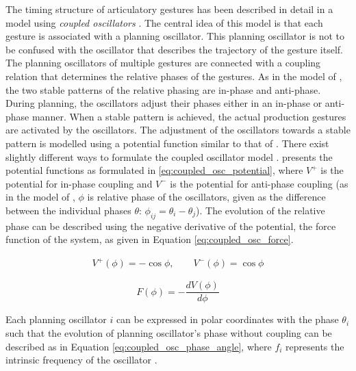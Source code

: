 The timing structure of articulatory gestures has been described in detail in a model using \emph{coupled oscillators} \citep{SaltzmanByrd2000, NamSaltzman2003, Goldsteinetal2009, Tilsen2017}. The central idea of this model is that each gesture is associated with a planning oscillator. This planning oscillator is not to be confused with the oscillator that describes the trajectory of the gesture itself. The planning oscillators of multiple gestures are connected with a coupling relation that determines the relative phases of the gestures. As in the model of \citet{HakenKelsoBunz1985}, the two stable patterns of the relative phasing are in-phase and anti-phase. During planning, the oscillators adjust their phases either in an in-phase or anti-phase manner. When a stable pattern is achieved, the actual production gestures are activated by the oscillators. The adjustment of the oscillators towards a stable pattern is modelled using a potential function similar to that of \citet{HakenKelsoBunz1985}. There exist slightly different ways to formulate the coupled oscillator model \citep{SaltzmanByrd2000, Tilsen2017}. \citet{Tilsen2017} presents the potential functions as formulated in \ref{eq:coupled_osc_potential}, where $V^+$ is the potential for  in-phase coupling and $V^-$ is the potential for anti-phase coupling (as in the model of \citeauthor*{HakenKelsoBunz1985}, $\phi$ is relative phase of the oscillators, given as the difference between the individual phases $\theta$: $\phi_{ij} = \theta_i - \theta_j$). The evolution of the relative phase  can be described using the negative derivative of the potential, the force function of the system, as given in Equation \ref{eq:coupled_osc_force}.

\begin{equation}
\begin{split}
V^+(\phi) = -\cos\phi, \quad\quad
V^-(\phi) = \cos\phi
\label{eq:coupled_osc_potential}
\end{split}
\end{equation}

\begin{equation}
F(\phi) = -\frac{dV(\phi)}{d\phi}
\label{eq:coupled_osc_force}
\end{equation}

Each planning oscillator $i$ can be expressed in polar coordinates with the phase $\theta_i$ such that the evolution of planning oscillator's phase without coupling can be described as in Equation \ref{eq:coupled_osc_phase_angle}, where $f_i$ represents the intrinsic frequency of the oscillator \citep{Tilsen2018}.

